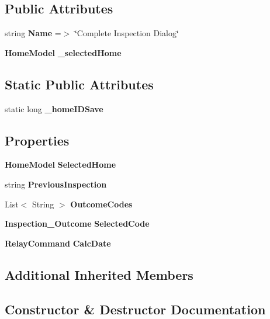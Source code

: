 \subsection*{Public Attributes}
\begin{DoxyCompactItemize}
\item 
string \textbf{ Name} =$>$ \char`\"{}Complete Inspection Dialog\char`\"{}
\item 
\textbf{ Home\+Model} \textbf{ \+\_\+selected\+Home}
\end{DoxyCompactItemize}
\subsection*{Static Public Attributes}
\begin{DoxyCompactItemize}
\item 
static long \textbf{ \+\_\+home\+I\+D\+Save}
\end{DoxyCompactItemize}
\subsection*{Properties}
\begin{DoxyCompactItemize}
\item 
\textbf{ Home\+Model} \textbf{ Selected\+Home}\hspace{0.3cm}{\ttfamily  [get, set]}
\item 
string \textbf{ Previous\+Inspection}\hspace{0.3cm}{\ttfamily  [get, set]}
\item 
List$<$ String $>$ \textbf{ Outcome\+Codes}\hspace{0.3cm}{\ttfamily  [get, set]}
\item 
\textbf{ Inspection\+\_\+\+Outcome} \textbf{ Selected\+Code}\hspace{0.3cm}{\ttfamily  [get, set]}
\item 
\textbf{ Relay\+Command} \textbf{ Calc\+Date}\hspace{0.3cm}{\ttfamily  [get]}
\end{DoxyCompactItemize}
\subsection*{Additional Inherited Members}


\subsection{Constructor \& Destructor Documentation}
\mbox{\label{class_a_f_h___scheduler_1_1_dialogs_1_1_complete_v_m_a1fa471acc4651c9673c3ab8ded4f0b11}} 
